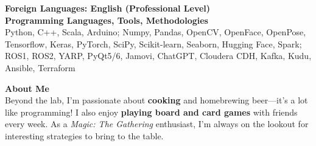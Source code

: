 \documentclass[10pt,a4paper,ragged2e]{altacv}
\begin{document}
    \divider    
    
    
\clearpage

\begin{fullwidth}

  \printbibliography[heading=pubtype,title=\empty, type=misc]

  \nocite{*}

  \printbibliography[heading=pubtype,title={\printinfo{\faFileTextO}{Journal}}, type=article]
  \divider

  \printbibliography[heading=pubtype,title={\printinfo{\faFileTextO}{Conference Proceedings}}, type=inproceedings]
  \divider

  \textbf{Foreign Languages: English (Professional Level)}\\

  \textbf{Programming Languages, Tools, Methodologies}\\
  Python, C++, Scala, Arduino; Numpy, Pandas, OpenCV, OpenFace, OpenPose, Tensorflow, Keras, PyTorch, SciPy, Scikit-learn, Seaborn, Hugging Face, Spark; ROS1, ROS2, YARP, PyQt5/6, Jamovi, ChatGPT, Cloudera CDH, Kafka, Kudu, Ansible, Terraform

  \textbf{About Me}\\
  Beyond the lab, I'm passionate about \textbf{cooking} and homebrewing beer—it’s a lot like programming! I also enjoy \textbf{playing board and card games} with friends every week. As a \textit{Magic: The Gathering} enthusiast, I'm always on the lookout for interesting strategies to bring to the table.

\end{fullwidth}
\end{document}
